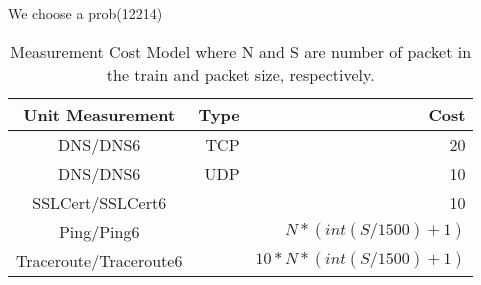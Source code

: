We choose a prob(12214) 
\begin{table}[h] 

\hspace{2in}
\centering 
\begin{tabular}{c rr} 
\hline\hline 
Unit Measurement& Type & Cost \\ [0.5ex] 
\hline 
DNS\slash DNS6 & TCP & 20\\ 
DNS\slash DNS6 & UDP & 10\\ 
SSLCert\slash SSLCert6 & & 10 \\
Ping\slash Ping6 & & $N * (int(S/1500)+1)$\\
Traceroute\slash Traceroute6 & & $ 10*N*(int(S/1500)+1)$\\[1ex] 
\hline 
\end{tabular} 
\caption{Measurement Cost Model where N and S are number of packet in the train and packet size, respectively.} 
\label{tab:cost} 
\end{table} 

